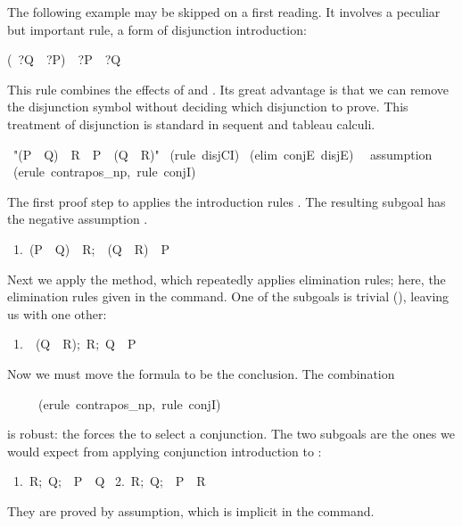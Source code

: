 \medskip

The following example may be skipped on a first reading.  It involves a
peculiar but important rule, a form of disjunction introduction:
\begin{isabelle}
(\isasymnot \ ?Q\ \isasymLongrightarrow \ ?P)\ \isasymLongrightarrow \ ?P\ \isasymor \ ?Q%
\end{isabelle}
This rule combines the effects of  and .  Its great
advantage is that we can remove the disjunction symbol without deciding
which disjunction to prove.  This treatment of disjunction is standard in sequent
and tableau calculi.

\begin{isabelle}
\ "(P\ \isasymor\ Q)\ \isasymand\ R\
\isasymLongrightarrow\ P\ \isasymor\ (Q\ \isasymand\ R)"\isanewline
{}\ (rule\ disjCI)\isanewline
{}\ (elim\ conjE\ disjE)\isanewline
\ \isacommand{apply}\ assumption
\isanewline
{}\ (erule\ contrapos_np,\ rule\ conjI)
\end{isabelle}
%
The first proof step to applies the introduction rules .
The resulting subgoal has the negative assumption 
\hbox{}.  

\begin{isabelle}
\ 1.\ \isasymlbrakk(P\ \isasymor\ Q)\ \isasymand\ R;\ \isasymnot\ (Q\ \isasymand\
R)\isasymrbrakk\ \isasymLongrightarrow\ P%
\end{isabelle}
Next we apply the  method, which repeatedly applies 
elimination rules; here, the elimination rules given 
in the command.  One of the subgoals is trivial (\isa{\isacommand{apply} assumption}),
leaving us with one other:
\begin{isabelle}
\ 1.\ \isasymlbrakk{\isasymnot}\ (Q\ \isasymand\ R);\ R;\ Q\isasymrbrakk\ \isasymLongrightarrow\ P%
\end{isabelle}
%
Now we must move the formula  to be the conclusion.  The
combination 
\begin{isabelle}
\ \ \ \ \ (erule\ contrapos_np,\ rule\ conjI)
\end{isabelle}
is robust: the  forces the  to select a
conjunction.  The two subgoals are the ones we would expect from applying
conjunction introduction to
\isa{Q~\isasymand~R}:  
\begin{isabelle}
\ 1.\ \isasymlbrakk R;\ Q;\ \isasymnot\ P\isasymrbrakk\ \isasymLongrightarrow\
Q\isanewline
\ 2.\ \isasymlbrakk R;\ Q;\ \isasymnot\ P\isasymrbrakk\ \isasymLongrightarrow\ R%
\end{isabelle}
They are proved by assumption, which is implicit in the 
command.%


